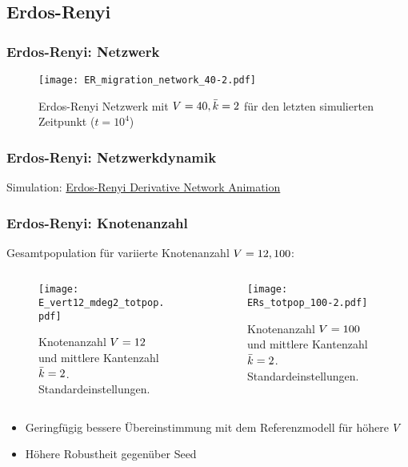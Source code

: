 \subsection{Erdos-Renyi}
\begin{frame}[t]
    \frametitle{Erdos-Renyi: Netzwerk}
    \begin{figure}[htpb]
        \centering
        \texttt{[image: ER\_migration\_network\_40-2.pdf]}
        \caption{Erdos-Renyi Netzwerk mit $V = 40, \bar{k} = 2$ für den letzten
        simulierten Zeitpunkt ($t= 10^{4}$)}%
        \label{fig:ER_migration_network_40-2}
    \end{figure}
\end{frame}
\begin{frame}[c]
    \frametitle{Erdos-Renyi: Netzwerkdynamik}
    Simulation: \href{run:/figures/animations/ER_animation_40-2.mp4}{Erdos-Renyi Derivative Network Animation}
\end{frame}
\begin{frame}[t]
    \frametitle{Erdos-Renyi: Knotenanzahl}
    Gesamtpopulation für variierte Knotenanzahl $V = 12, 100$: 
    \begin{columns}
        \begin{column}{0.5\textwidth}
    \begin{figure}[htpb]
        \centering
        \texttt{[image: E\_vert12\_mdeg2\_totpop.pdf]}
        \caption{Knotenanzahl $V=12$ und mittlere Kantenzahl $\bar{k} = 2$.
        Standardeinstellungen.}%
        \label{fig:E_vert12_mdeg2_totpop}
    \end{figure}
\end{column}
\begin{column}{0.5\textwidth}
    \begin{figure}[htpb]
        \centering
        \texttt{[image: ERs\_totpop\_100-2.pdf]}
        \caption{Knotenanzahl $V=100$ und mittlere Kantenzahl $\bar{k} = 2$.
        Standardeinstellungen.}%
        \label{fig:ERs_totpop_100-2-a}
    \end{figure}
\end{column}
\end{columns}
\begin{itemize}
    \item Geringfügig bessere Übereinstimmung mit dem Referenzmodell für höhere $V$
    \item Höhere Robustheit gegenüber Seed
\end{itemize}
\end{frame}
